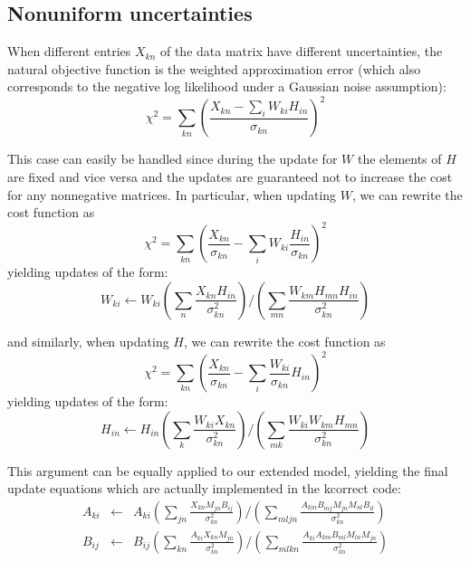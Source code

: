 \documentclass[10pt,preprint]{aastex}
\newcommand{\T}{^{\scriptscriptstyle \top}}
\newcommand{\XX}{X}
\newcommand{\XXt}{\tilde{X}}
\newcommand{\Xkn}{X_{kn}}
\newcommand{\WW}{W}
\newcommand{\WWt}{\tilde{W}}
\newcommand{\Wki}{W_{ki}}
\newcommand{\HH}{H}
\newcommand{\HHt}{\tilde{H}}
\newcommand{\Hin}{H_{in}}
\newcommand{\Aki}{A_{ki}}
\newcommand{\Bij}{B_{ij}}
\newcommand{\Mjn}{M_{jn}}
\newcommand{\skn}{\sigma_{kn}}
\begin{document}
\subsection{Nonuniform uncertainties}
When different entries $\Xkn$ of the data matrix have different
uncertainties, the natural objective function is the weighted approximation
error (which also corresponds to the negative log likelihood under a
Gaussian noise assumption):
\begin{equation}
\chi^2 = \sum_{kn} \left( \frac{\Xkn - 
\sum_i \Wki\Hin}{\skn}\right)^2
\end{equation}

This case can easily be handled since during the update for $\WW$ the
elements of $\HH$ are fixed and vice versa and the updates are
guaranteed not to increase the cost for any nonnegative matrices.
In particular, when updating $\WW$, we can rewrite the cost function as
\begin{equation}
\chi^2 = \sum_{kn} \left( \frac{\Xkn}{\skn} - 
\sum_i \Wki\frac{\Hin}{\skn}\right)^2
\end{equation}
yielding updates of the form:
\begin{equation}
\Wki \leftarrow \Wki 
\left( \sum_n \frac{\Xkn\Hin}{\skn^2} \right) / 
\left( \sum_{mn} \frac{W_{km}H_{mn}\Hin}{\skn^2}\right)
\end{equation}

and similarly, when updating $\HH$, we can rewrite the cost function as
\begin{equation}
\chi^2 = \sum_{kn} \left( \frac{\Xkn}{\skn} - 
\sum_i \frac{\Wki}{\skn}\Hin\right)^2
\end{equation}
yielding updates of the form:
\begin{equation}
\Hin \leftarrow \Hin
\left( \sum_k \frac{\Wki\Xkn}{\skn^2}\right) /
\left( \sum_{mk} \frac{\Wki{}W_{km}H_{mn}}{\skn^2}\right)
\end{equation}

This argument can be equally applied to our extended model, yielding
the final update equations which are actually implemented in the
kcorrect code:
\begin{eqnarray} 
\Aki &\leftarrow& \Aki 
\left( \sum_{jn} \frac{\Xkn\Mjn\Bij}{\skn^2}\right) / 
\left( \sum_{mljn} \frac{A_{km}B_{mj}M_{jn}M_{nl}B_{il}}{\skn^2}\right) \\
\Bij &\leftarrow& \Bij
\left( \sum_{kn} \frac{\Aki\Xkn\Mjn}{\skn^2}\right) / 
\left( \sum_{mlkn} \frac{A_{ki}A_{km}B_{ml}M_{ln}M_{jn}}{\skn^2}\right)
\end{eqnarray}
\end{document}
